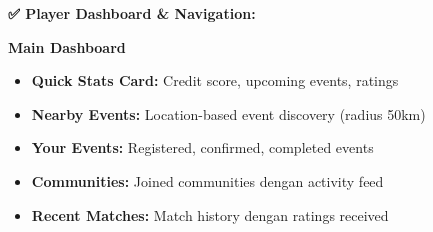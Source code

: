 \documentclass[12pt,a4paper]{article}
\begin{document}
\begin{implemented}
\textbf{✅ Player Dashboard \& Navigation:}

\textbf{Main Dashboard}
\begin{itemize}
    \item \textbf{Quick Stats Card:} Credit score, upcoming events, ratings
    \item \textbf{Nearby Events:} Location-based event discovery (radius 50km)
    \item \textbf{Your Events:} Registered, confirmed, completed events
    \item \textbf{Communities:} Joined communities dengan activity feed
    \item \textbf{Recent Matches:} Match history dengan ratings received
\end{itemize}


\end{implemented}
\end{document}
